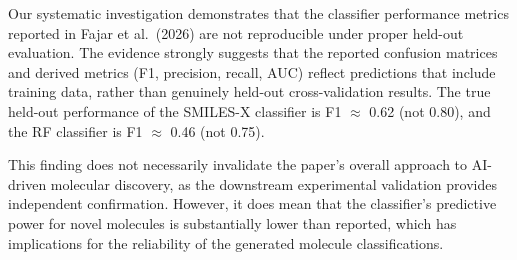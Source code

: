 \documentclass[11pt,a4paper]{article}
\begin{document}
Our systematic investigation demonstrates that the classifier performance metrics reported in Fajar et al.\ (2026) are not reproducible under proper held-out evaluation. The evidence strongly suggests that the reported confusion matrices and derived metrics (F1, precision, recall, AUC) reflect predictions that include training data, rather than genuinely held-out cross-validation results. The true held-out performance of the SMILES-X classifier is F1 $\approx$ 0.62 (not 0.80), and the RF classifier is F1 $\approx$ 0.46 (not 0.75).

This finding does not necessarily invalidate the paper's overall approach to AI-driven molecular discovery, as the downstream experimental validation provides independent confirmation. However, it does mean that the classifier's predictive power for novel molecules is substantially lower than reported, which has implications for the reliability of the generated molecule classifications.
\end{document}
